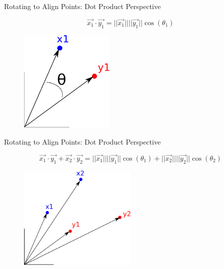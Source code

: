 \documentclass{beamer}
\begin{document}
\begin{frame}{Rotating to Align Points: Dot Product Perspective}

\[ \vec{x_1} \cdot \vec{y_1} = ||\vec{x_1}|| ||\vec{y_1}|| \cos(\theta_1) \]

\begin{figure}[t]
	\centering
    \includegraphics[width=0.4\textwidth]{PointsAlign.pdf}
\end{figure}

\end{frame}


\begin{frame}{Rotating to Align Points: Dot Product Perspective}

\[ \vec{x_1} \cdot \vec{y_1} + \vec{x_2} \cdot \vec{y_2} = ||\vec{x_1}|| ||\vec{y_1}|| \cos(\theta_1) + ||\vec{x_2}|| ||\vec{y_2}|| \cos(\theta_2) \]

\begin{figure}[t]
	\centering
    \includegraphics[width=0.5\textwidth]{PointsAlign2.pdf}
\end{figure}

\end{frame}
\end{document}
